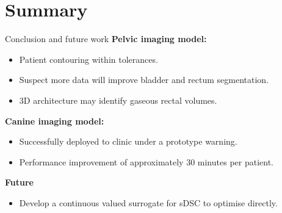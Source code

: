\documentclass[9pt]{beamer}
\begin{document}
\section{Summary}
\begin{frame}{Conclusion and future work}
\textbf{Pelvic imaging model:}
\begin{itemize}
	\item Patient contouring within tolerances.
	\item Suspect more data will improve bladder and rectum segmentation.
	\item 3D architecture may identify gaseous rectal volumes.

  \end{itemize}
  \vspace{4mm}

 \textbf{Canine imaging model:}
 \begin{itemize}
  \item Successfully deployed to clinic under a prototype warning.
  \item Performance improvement of approximately 30 minutes per patient.
\end{itemize}
\vspace{4mm}

\textbf{Future}
\begin{itemize}
\item Develop a continuous valued surrogate for sDSC to optimise directly.
\end{itemize}
\end{frame}
%
\end{document}
